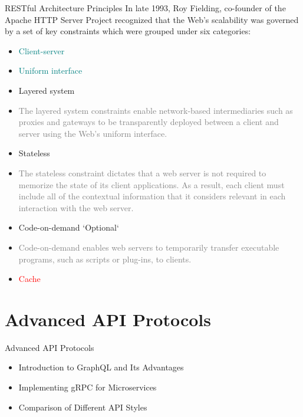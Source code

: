 \documentclass{beamer}
\begin{document}
\begin{frame}[t]{RESTful Architecture Principles}
	\scriptsize
	In late 1993, Roy Fielding, co-founder of the Apache HTTP Server Project recognized that the Web’s scalability was governed by a set of key constraints which were grouped under six categories:
	\begin{itemize}
    	\item \textcolor{teal}{Client-server}
    	\item \textcolor{teal}{Uniform interface}

    	\item Layered system
    	
    	\item[] \textcolor{gray}{\tiny The layered system constraints enable network-based intermediaries such as proxies and gateways to be transparently deployed between a client and server using the Web’s uniform interface.} 
    	
    	\item Stateless
    	\item[] \textcolor{gray}{ \tiny The stateless constraint dictates that a web server is not required to memorize the state of its client applications. As a result, each client must include all of the contextual information that it considers relevant in each interaction with the web server. }
    	
    	\item Code-on-demand `Optional`
    	\item[] \textcolor{gray}{\tiny Code-on-demand enables web servers to temporarily transfer executable programs, such as scripts or plug-ins, to clients.}

    	\item \textcolor{red} {Cache}
	\end{itemize}
\end{frame}


\section{Advanced API Protocols}
\begin{frame}{Advanced API Protocols}
  \begin{itemize}
    \item Introduction to GraphQL and Its Advantages
    \item Implementing gRPC for Microservices
    \item Comparison of Different API Styles
  \end{itemize}
\end{frame}
\end{document}
